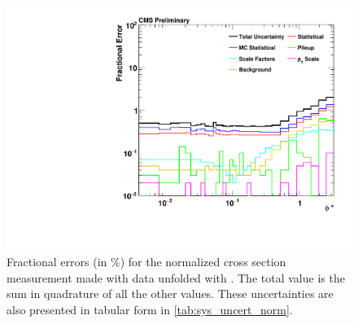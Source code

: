 \begin{figure}[!p]
    \centering
    \includegraphics[width=\textwidth]{figures/data_uncertainty_normalized.pdf}
    \caption[
        Fractional errors (in \%) for the normalized cross section measurement
        made with data unfolded with \MADGRAPH.
    ]{
        Fractional errors (in \%) for the normalized cross section measurement
        made with data unfolded with \MADGRAPH. The total value is the sum in
        quadrature of all the other values. These uncertainties are also
        presented in tabular form in \cref{tab:sys_uncert_norm}.
    }
    \label{fig:sys_uncert_norm}
\end{figure}
